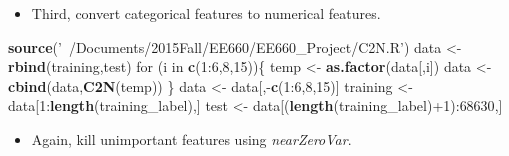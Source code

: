 \documentclass[]{article}
\newenvironment{Shaded}{\begin{snugshade}}{\end{snugshade}}
\newcommand{\KeywordTok}[1]{\textcolor[rgb]{0.13,0.29,0.53}{\textbf{{#1}}}}
\newcommand{\DataTypeTok}[1]{\textcolor[rgb]{0.13,0.29,0.53}{{#1}}}
\newcommand{\DecValTok}[1]{\textcolor[rgb]{0.00,0.00,0.81}{{#1}}}
\newcommand{\StringTok}[1]{\textcolor[rgb]{0.31,0.60,0.02}{{#1}}}
\newcommand{\OtherTok}[1]{\textcolor[rgb]{0.56,0.35,0.01}{{#1}}}
\newcommand{\NormalTok}[1]{{#1}}
\begin{document}
\begin{itemize}
  \begin{itemize}
  \itemsep1pt\parskip0pt
  \item
    Third, convert categorical features to numerical features.
  \end{itemize}

\begin{Shaded}
\begin{Highlighting}[]
    \KeywordTok{source}\NormalTok{(}\StringTok{'~/Documents/2015Fall/EE660/EE660_Project/C2N.R'}\NormalTok{)}
    \NormalTok{data <-}\StringTok{ }\KeywordTok{rbind}\NormalTok{(training,test)}
    \NormalTok{for (i in }\KeywordTok{c}\NormalTok{(}\DecValTok{1}\NormalTok{:}\DecValTok{6}\NormalTok{,}\DecValTok{8}\NormalTok{,}\DecValTok{15}\NormalTok{))\{}
        \NormalTok{temp <-}\StringTok{ }\KeywordTok{as.factor}\NormalTok{(data[,i])}
        \NormalTok{data <-}\StringTok{ }\KeywordTok{cbind}\NormalTok{(data,}\KeywordTok{C2N}\NormalTok{(temp))}
    \NormalTok{\}}
    \NormalTok{data <-}\StringTok{ }\NormalTok{data[,-}\KeywordTok{c}\NormalTok{(}\DecValTok{1}\NormalTok{:}\DecValTok{6}\NormalTok{,}\DecValTok{8}\NormalTok{,}\DecValTok{15}\NormalTok{)]}
    \NormalTok{training <-}\StringTok{ }\NormalTok{data[}\DecValTok{1}\NormalTok{:}\KeywordTok{length}\NormalTok{(training_label),]}
    \NormalTok{test <-}\StringTok{ }\NormalTok{data[(}\KeywordTok{length}\NormalTok{(training_label)+}\DecValTok{1}\NormalTok{):}\DecValTok{68630}\NormalTok{,]}
\end{Highlighting}
\end{Shaded}

  \begin{itemize}
  \itemsep1pt\parskip0pt
  \item
    Again, kill unimportant features using \emph{nearZeroVar}.
  \end{itemize}

\begin{Shaded}
\end{Shaded}


\end{itemize}
\end{document}
